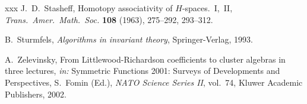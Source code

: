 \documentclass[letterpaper]{amsart}
\numberwithin{equation}{section}
\theoremstyle{definition}
\begin{document}
\begin{thebibliography}{xxx}
J.~D.~Stasheff, 
Homotopy associativity of $H$-spaces.~I,~II, 
\textsl{Trans.\ Amer.\ Math.\ Soc.} \textbf{108} (1963), 275--292, 293--312. 
 
B.~Sturmfels, 
\textsl{Algorithms in invariant theory}, 
Springer-Verlag, %
1993. 
 
A.~Zelevinsky, 
 From Littlewood-Richardson coefficients to cluster algebras in three 
 lectures, 
\emph{in:} 
Symmetric Functions 2001: Surveys of Developments and Perspectives, 
S.~Fomin (Ed.), 
\textsl{NATO Science Series II}, %
vol.~74, 
Kluwer Academic Publishers, %
2002. 
 
 
\end{thebibliography} 
 
\end{document}
